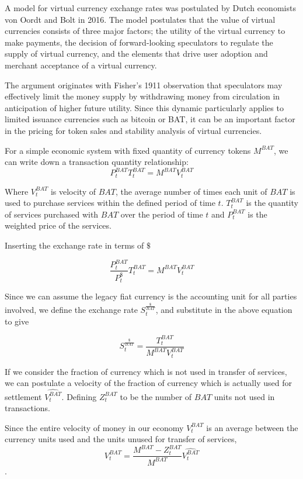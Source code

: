 \documentclass[11pt]{article}
\begin{document}
A model for virtual currency exchange rates was postulated by Dutch
economists von Oordt and Bolt in 2016\cite{22}. The model postulates that the
value of virtual currencies consists of three major factors; the
utility of the virtual currency to make payments, the decision of
forward-looking speculators to regulate the supply of virtual
currency, and the elements that drive user adoption and merchant
acceptance of a virtual currency.   

The argument originates with Fisher's 1911 observation that
speculators may effectively limit the money supply by withdrawing
money from circulation in anticipation of higher future utility. Since
this dynamic particularly applies to limited issuance currencies such
as bitcoin or BAT, it can be an important factor in the pricing for
token sales and stability analysis of virtual currencies.   

For a simple economic system with fixed quantity of currency tokens $M^{BAT}$,
we can write down a transaction quantity relationship: 
\[P^{BAT}_{t} T^{BAT}_{t} = M^{BAT} V^{BAT}_{t} \]

Where $V^{BAT}_{t} $ is velocity of $BAT$, the average number
of times each unit of $BAT$ is used to purchase services within
the defined period of time $t$. $T^{BAT}_{t}$ is the quantity
of services purchased with $BAT$ over the period of time $t$
and $P^{BAT}_{t}$ is the weighted price of the services. 
   
Inserting the exchange rate in terms of $\$$

\[ \frac{P^{BAT}_{t}}{P^{\$}_{t}} T^{BAT}_{t} = M^{BAT} V^{BAT}_{t}\]

Since we can assume the legacy fiat currency is the accounting unit
for all parties involved, we define the exchange rate $S^{\frac{\$}{BAT}}_{t}$, and substitute
in the above equation to give 

 \[S^{\frac{\$}{BAT}}_{t} = \frac{T^{BAT}_{t}}{M^{BAT} V^{BAT}_{t}} \]

If we consider the fraction of currency which is not used in transfer of services, we can postulate a velocity of the fraction of currency which is actually used for settlement $\widehat{V^{BAT}_{t}}$.
Defining $Z^{BAT}_{t}$ to be the number of $BAT$ units not used in transactions.


Since the entire velocity of money in our economy $V^{BAT}_{t}$ is an average
between the currency units used and the units unused for transfer of
services, 
   \[ V^{BAT}_{t} = \frac{M^{BAT}-Z^{BAT}_{t}}{M^{BAT}} \widehat{V^{BAT}_{t}}\]. 
\end{document}
